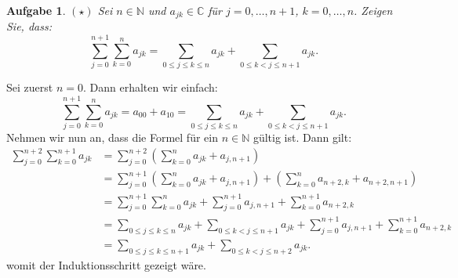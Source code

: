 \documentclass[a4paper, 20]{exam}
\newtheorem{ex}{Aufgabe}
\newcommand\NN{\mathbb{N}}
\begin{document}
\begin{ex} {$(\star)$} Sei $n \in \NN$ und $a_{jk} \in \mathbb{C}$ für $j = 0,\dots,n + 1$, $k = 0,\dots,n$. Zeigen Sie, dass:
	\begin{equation*}
		\sum_{j = 0}^{n+1}\sum_{k = 0}^n a_{jk} = \sum_{0 \leq j \leq k \leq n}a_{jk} + \sum_{0 \leq k < j \leq n+1} a_{jk}.
	\end{equation*}
\end{ex}

\begin{solution} Sei zuerst $n = 0$. Dann erhalten wir einfach:
	\begin{equation*}
		\sum_{j = 0}^{n+1}\sum_{k = 0}^n a_{jk} = a_{00} + a_{10} =  \sum_{0 \leq j \leq k \leq n}a_{jk} + \sum_{0 \leq k < j \leq n+1} a_{jk}.
	\end{equation*}
	Nehmen wir nun an, dass die Formel für ein $n \in \NN$ gültig ist. Dann gilt: 
	\begin{align*}
		\sum_{j = 0}^{n+2}\sum_{k = 0}^{n+1} a_{jk} &= \sum_{j = 0}^{n + 2}\left( {\sum_{k = 0}^n a_{jk} + a_{j,n+1}} \right) \\
		&= \sum_{j = 0}^{n + 1}\left( {\sum_{k = 0}^n a_{jk} + a_{j,n+1}}\right) + \left( {\sum_{k = 0}^n a_{n+2,k} + a_{n+2,n+1}}\right) \\
		&= \sum_{j = 0}^{n + 1}\sum_{k = 0}^n a_{jk} + \sum_{j = 0}^{n + 1}a_{j,n+1} + \sum_{k = 0}^{n+1} a_{n+2,k}\\
		&= \sum_{0 \leq j \leq k \leq n}a_{jk} + \sum_{0 \leq k < j \leq n+1} a_{jk} + \sum_{j = 0}^{n + 1}a_{j,n+1} + \sum_{k = 0}^{n+1} a_{n+2,k}\\
		&= \sum_{0 \leq j \leq k \leq n + 1}a_{jk} + \sum_{0 \leq k < j \leq n+2} a_{jk}.
	\end{align*}
	womit der Induktionsschritt gezeigt wäre. 
\end{solution}
\end{document}

